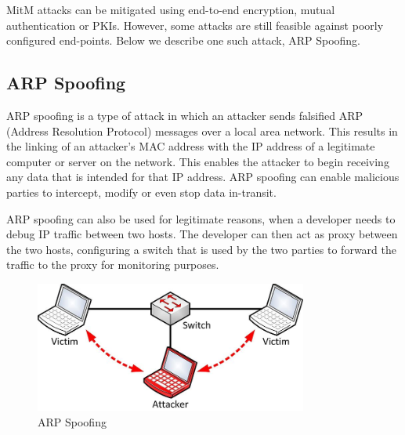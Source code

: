 MitM attacks can be mitigated using end-to-end encryption, mutual authentication
or PKIs. However, some attacks are still feasible against poorly configured
end-points. Below we describe one such attack, ARP Spoofing.


\subsection{ARP Spoofing}

ARP spoofing\cite{arpspoofing} is a type of attack in which an attacker sends falsified ARP
(Address Resolution Protocol)\cite{arp} messages over a local area network.
This results in the linking of an attacker’s MAC address with the IP address
of a legitimate computer or server on the network. This enables the attacker to
begin receiving any data that is intended for that IP address. ARP spoofing can 
enable malicious parties to intercept, modify or even stop data in-transit.

ARP spoofing can also be used for legitimate reasons, when a developer needs to
debug IP traffic between two hosts. The developer can then act as proxy between
the two hosts, configuring a switch that is used by the two parties to forward
the traffic to the proxy for monitoring purposes.

\begin{figure}[H] \caption{ARP Spoofing} \centering
\includegraphics[width=0.8\textwidth]{diagrams/arp_spoofing.jpg}\end{figure}


